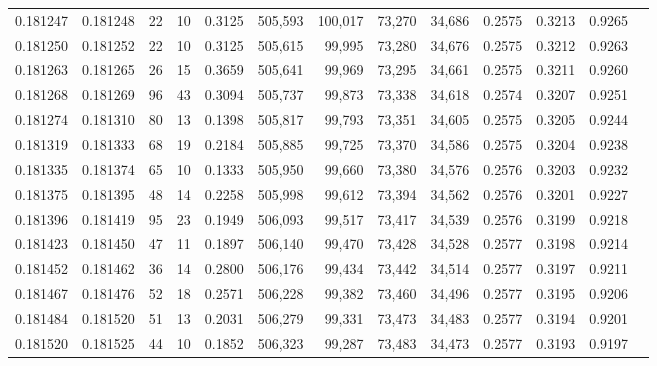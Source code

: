 \begin{tabular}{rrrrrrrrrrrrr}
0.181247 & 0.181248 &    22 &  10 &                                     0.3125 & 505,593 & 100,017 &  73,270 &  34,686 & 0.2575 & 0.3213 & 0.9265 \\
0.181250 & 0.181252 &    22 &  10 &                                     0.3125 & 505,615 &  99,995 &  73,280 &  34,676 & 0.2575 & 0.3212 & 0.9263 \\
0.181263 & 0.181265 &    26 &  15 &                                     0.3659 & 505,641 &  99,969 &  73,295 &  34,661 & 0.2575 & 0.3211 & 0.9260 \\
0.181268 & 0.181269 &    96 &  43 &                                     0.3094 & 505,737 &  99,873 &  73,338 &  34,618 & 0.2574 & 0.3207 & 0.9251 \\
0.181274 & 0.181310 &    80 &  13 &                                     0.1398 & 505,817 &  99,793 &  73,351 &  34,605 & 0.2575 & 0.3205 & 0.9244 \\
0.181319 & 0.181333 &    68 &  19 &                                     0.2184 & 505,885 &  99,725 &  73,370 &  34,586 & 0.2575 & 0.3204 & 0.9238 \\
0.181335 & 0.181374 &    65 &  10 &                                     0.1333 & 505,950 &  99,660 &  73,380 &  34,576 & 0.2576 & 0.3203 & 0.9232 \\
0.181375 & 0.181395 &    48 &  14 &                                     0.2258 & 505,998 &  99,612 &  73,394 &  34,562 & 0.2576 & 0.3201 & 0.9227 \\
0.181396 & 0.181419 &    95 &  23 &                                     0.1949 & 506,093 &  99,517 &  73,417 &  34,539 & 0.2576 & 0.3199 & 0.9218 \\
0.181423 & 0.181450 &    47 &  11 &                                     0.1897 & 506,140 &  99,470 &  73,428 &  34,528 & 0.2577 & 0.3198 & 0.9214 \\
0.181452 & 0.181462 &    36 &  14 &                                     0.2800 & 506,176 &  99,434 &  73,442 &  34,514 & 0.2577 & 0.3197 & 0.9211 \\
0.181467 & 0.181476 &    52 &  18 &                                     0.2571 & 506,228 &  99,382 &  73,460 &  34,496 & 0.2577 & 0.3195 & 0.9206 \\
0.181484 & 0.181520 &    51 &  13 &                                     0.2031 & 506,279 &  99,331 &  73,473 &  34,483 & 0.2577 & 0.3194 & 0.9201 \\
0.181520 & 0.181525 &    44 &  10 &                                     0.1852 & 506,323 &  99,287 &  73,483 &  34,473 & 0.2577 & 0.3193 & 0.9197 \\

\end{tabular}

